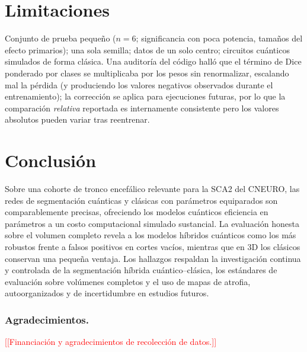\documentclass[runningheads]{llncs}
\newcommand{\todo}[1]{\textcolor{red}{[[#1]]}}
\begin{document}
\section{Limitaciones}\label{sec:lim}
Conjunto de prueba pequeño ($n{=}6$; significancia con poca potencia, tamaños del
efecto primarios); una sola semilla; datos de un solo centro; circuitos cuánticos
simulados de forma clásica. Una auditoría del código halló que el término de Dice
ponderado por clases se multiplicaba por los pesos sin renormalizar, escalando mal
la pérdida (y produciendo los valores negativos observados durante el
entrenamiento); la corrección se aplica para ejecuciones futuras, por lo que la
comparación \emph{relativa} reportada es internamente consistente pero los valores
absolutos pueden variar tras reentrenar.

\section{Conclusión}
Sobre una cohorte de tronco encefálico relevante para la SCA2 del CNEURO, las
redes de segmentación cuánticas y clásicas con parámetros equiparados son
comparablemente precisas, ofreciendo los modelos cuánticos eficiencia en
parámetros a un costo computacional simulado sustancial. La evaluación honesta
sobre el volumen completo revela a los modelos híbridos cuánticos como los más
robustos frente a falsos positivos en cortes vacíos, mientras que en 3D los
clásicos conservan una pequeña ventaja. Los hallazgos respaldan la investigación
continua y controlada de la segmentación híbrida cuántico--clásica, los estándares
de evaluación sobre volúmenes completos y el uso de mapas de atrofia,
autoorganizados y de incertidumbre en estudios futuros.

\subsubsection*{Agradecimientos.} \todo{Financiación y agradecimientos de
recolección de datos.}
\end{document}
